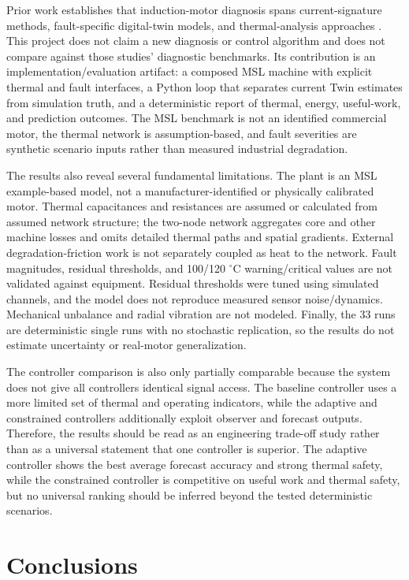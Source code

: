 \documentclass[machines,article,submit,moreauthors]{Definitions/mdpi}
\begin{document}
Prior work establishes that induction-motor diagnosis spans current-signature methods, fault-specific digital-twin models, and thermal-analysis approaches \cite{benbouzid2000,liu2017,adamou2024,chen2025,staton2005}. This project does not claim a new diagnosis or control algorithm and does not compare against those studies' diagnostic benchmarks. Its contribution is an implementation/evaluation artifact: a composed MSL machine with explicit thermal and fault interfaces, a Python loop that separates current Twin estimates from simulation truth, and a deterministic report of thermal, energy, useful-work, and prediction outcomes. The MSL benchmark is not an identified commercial motor, the thermal network is assumption-based, and fault severities are synthetic scenario inputs rather than measured industrial degradation.

The results also reveal several fundamental limitations. The plant is an MSL example-based model, not a manufacturer-identified or physically calibrated motor. Thermal capacitances and resistances are assumed or calculated from assumed network structure; the two-node network aggregates core and other machine losses and omits detailed thermal paths and spatial gradients. External degradation-friction work is not separately coupled as heat to the network. Fault magnitudes, residual thresholds, and 100/120 $^{\circ}$C warning/critical values are not validated against equipment. Residual thresholds were tuned using simulated channels, and the model does not reproduce measured sensor noise/dynamics. Mechanical unbalance and radial vibration are not modeled. Finally, the 33 runs are deterministic single runs with no stochastic replication, so the results do not estimate uncertainty or real-motor generalization.

The controller comparison is also only partially comparable because the system does not give all controllers identical signal access. The baseline controller uses a more limited set of thermal and operating indicators, while the adaptive and constrained controllers additionally exploit observer and forecast outputs. Therefore, the results should be read as an engineering trade-off study rather than as a universal statement that one controller is superior. The adaptive controller shows the best average forecast accuracy and strong thermal safety, while the constrained controller is competitive on useful work and thermal safety, but no universal ranking should be inferred beyond the tested deterministic scenarios.

\section{Conclusions}
\label{sec:conclusions}
\end{document}
